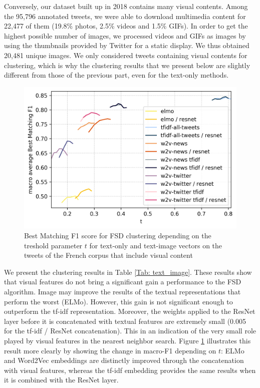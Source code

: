 Conversely, our dataset built up in 2018 contains many visual contents. Among the 95,796 annotated tweets, we were able to download multimedia content for 22,477 of them (19.8\% photos, 2.5\% videos and 1.5\% GIFs). In order to get the highest possible number of images, we processed videos and GIFs as images by using the thumbnails provided by Twitter for a static display.  We thus obtained 20,481 unique images. We only considered tweets containing visual contents for clustering, which is why the clustering results that we present below are slightly different from those of the previous part, even for the text-only methods.


\begin{figure}[h]
  \centering
  \includegraphics[width=.7\linewidth]{figures/text_image_clustering.png}
  \caption{Best Matching F1 score for FSD clustering depending on the treshold parameter $t$ for text-only and text-image vectors on the tweets of the French corpus that include visual content}
  \label{Fig:text-image}
\end{figure}


We present the clustering results in Table \ref{Tab: text_image}. These results show that visual features do not bring a significant gain a performance to the FSD algorithm. Image may improve the results of the textual representations that perform the worst (ELMo). However, this gain is not significant enough to outperform the tf-idf representation. Moreover, the weights applied to the ResNet layer before it is concatenated with textual features are extremely small (0.005 for the tf-idf / ResNet concatenation). This in an indication of the very small role played by visual features in the nearest neighbor search. Figure \ref{Fig:text-image} illustrates this result more clearly by showing the change in macro-F1 depending on $t$: ELMo and Word2Vec embeddings are distinctly improved through the concatenation with visual features, whereas the tf-idf embedding provides the same results when it is combined with the ResNet layer.

